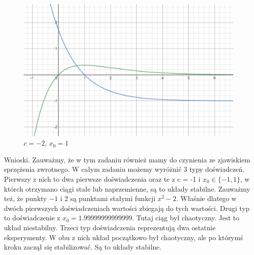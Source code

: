 \documentclass[]{article}
\begin{document}
\begin{figure}[!htbp]
	\includegraphics[scale=1]{e1-x-1andxe-x.png}
	\centering
	\caption{$c = -2$, $x_0 = 1$}
\end{figure}

Wnioski. Zauważmy, że w tym zadaniu również mamy do czynienia ze zjawiskiem sprzężenia zwrotnego. W całym zadaniu możemy wyróżnić 3 typy doświadczeń. Pierwszy z nich to dwa pierwsze doświadczenia oraz te z c = -1 i $x_0 \in \{-1,1\}$, w którch otrzymano ciągi stałe lub naprzemienne, są to układy stabilne. Zauważmy też, że punkty $-1$ i $2$ są punktami stałymi funkcji $x^2 - 2$. Właśnie dlatego w dwóch pierwszych doświadczeniach wartości zbiegają do tych wartości. Drugi typ to doświadczenie z $x_0 = 1.99999999999999$. Tutaj ciąg był chaotyczny. Jest to układ niestabilny. Trzeci typ doświadczenia reprezentują dwa ostatnie eksperymenty. W obu z nich układ początkowo był chaotyczny, ale po którymś kroku zaczął się stabilizować. Są to układy stabilne.
\end{document}
